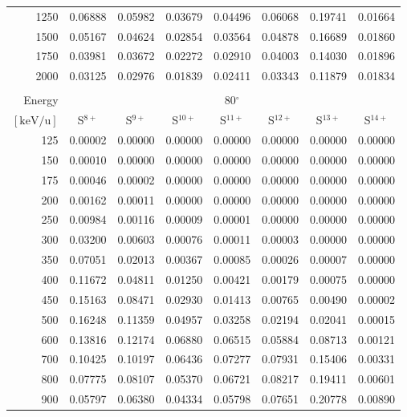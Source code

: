 \begin{longtable}{r|c|c|c|c|c|c|c}
     1250 & 0.06888 & 0.05982 & 0.03679 & 0.04496 & 0.06068 & 0.19741 & 0.01664 \\
     1500 & 0.05167 & 0.04624 & 0.02854 & 0.03564 & 0.04878 & 0.16689 & 0.01860 \\
     1750 & 0.03981 & 0.03672 & 0.02272 & 0.02910 & 0.04003 & 0.14030 & 0.01896 \\
     2000 & 0.03125 & 0.02976 & 0.01839 & 0.02411 & 0.03343 & 0.11879 & 0.01834 \\
    \cline{1-8}
    \pagebreak
    \multicolumn{8}{c}{Atmosphere 1 (Original atmosphere)} \\ \cline{2-8}
    Energy & \multicolumn{7}{c}{80$^\circ$} \\ \cline{2-8}
    $\mathrm{[keV/u]}$ & S$^{8+}$ & S$^{9+}$ & S$^{10+}$ & S$^{11+}$ & S$^{12+}$ & S$^{13+}$ & S$^{14+}$ \\ \cline{1-8}
      125 & 0.00002 & 0.00000 & 0.00000 & 0.00000 & 0.00000 & 0.00000 & 0.00000 \\
      150 & 0.00010 & 0.00000 & 0.00000 & 0.00000 & 0.00000 & 0.00000 & 0.00000 \\
      175 & 0.00046 & 0.00002 & 0.00000 & 0.00000 & 0.00000 & 0.00000 & 0.00000 \\
      200 & 0.00162 & 0.00011 & 0.00000 & 0.00000 & 0.00000 & 0.00000 & 0.00000 \\
      250 & 0.00984 & 0.00116 & 0.00009 & 0.00001 & 0.00000 & 0.00000 & 0.00000 \\
      300 & 0.03200 & 0.00603 & 0.00076 & 0.00011 & 0.00003 & 0.00000 & 0.00000 \\
      350 & 0.07051 & 0.02013 & 0.00367 & 0.00085 & 0.00026 & 0.00007 & 0.00000 \\
      400 & 0.11672 & 0.04811 & 0.01250 & 0.00421 & 0.00179 & 0.00075 & 0.00000 \\
      450 & 0.15163 & 0.08471 & 0.02930 & 0.01413 & 0.00765 & 0.00490 & 0.00002 \\
      500 & 0.16248 & 0.11359 & 0.04957 & 0.03258 & 0.02194 & 0.02041 & 0.00015 \\
      600 & 0.13816 & 0.12174 & 0.06880 & 0.06515 & 0.05884 & 0.08713 & 0.00121 \\
      700 & 0.10425 & 0.10197 & 0.06436 & 0.07277 & 0.07931 & 0.15406 & 0.00331 \\
      800 & 0.07775 & 0.08107 & 0.05370 & 0.06721 & 0.08217 & 0.19411 & 0.00601 \\
      900 & 0.05797 & 0.06380 & 0.04334 & 0.05798 & 0.07651 & 0.20778 & 0.00890 \\

\end{longtable}
